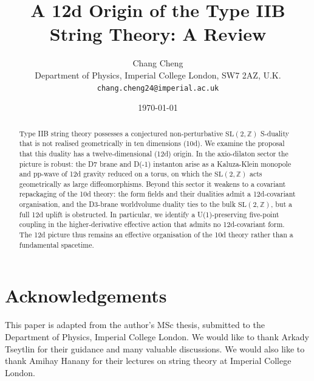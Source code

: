 \documentclass[11pt]{article}
\title{\bfseries A 12d Origin of the Type IIB String Theory: A Review}
\author{Chang Cheng\\[2pt]
\normalsize Department of Physics, Imperial College London, SW7 2AZ, U.K.\\
\normalsize \texttt{chang.cheng24@imperial.ac.uk}}
\date{\today}
\newcommand{\SLZ}{\ensuremath{\mathrm{SL}(2,\mathbb{Z})}}
\begin{document}
\maketitle

\begin{abstract}
\noindent
Type IIB string theory possesses a conjectured non-perturbative \SLZ{} S-duality that is not realised geometrically in ten dimensions (10d).
We examine the proposal that this duality has a twelve-dimensional (12d) origin.
In the axio-dilaton sector the picture is robust: the D7 brane and D(-1) instanton arise as a Kaluza-Klein monopole and pp-wave of 12d gravity reduced on a torus, on which the \SLZ{} acts geometrically as large diffeomorphisms.
Beyond this sector it weakens to a covariant repackaging of the 10d theory: the form fields and their dualities admit a 12d-covariant organisation, and the D3-brane worldvolume duality ties to the bulk \SLZ{}, but a full 12d uplift is obstructed.
In particular, we identify a U(1)-preserving five-point coupling in the higher-derivative effective action that admits no 12d-covariant form.
The 12d picture thus remains an effective organisation of the 10d theory rather than a fundamental spacetime.
\end{abstract}

\tableofcontents
\clearpage









\section*{Acknowledgements}

This paper is adapted from the author's MSc thesis, submitted to the Department of Physics, Imperial College London.
We would like to thank Arkady Tseytlin for their guidance and many valuable discussions.
We would also like to thank Amihay Hanany for their lectures on string theory at Imperial College London.

\appendix








\end{document}
